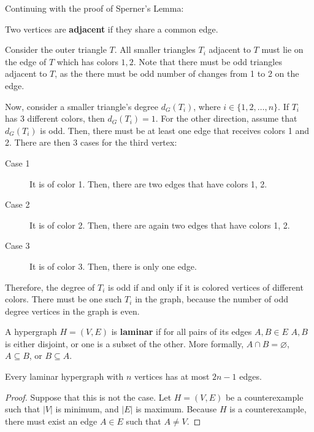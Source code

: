 
Continuing with the proof of Sperner's Lemma:

\begin{definition}
	Two vertices are \textbf{adjacent} if they share a common edge.
\end{definition}

\begin{replacementproof}
	Consider the outer triangle \( T \). All smaller triangles \( T_i \) adjacent to \( T \) must lie on the edge of \( T \) which has colors \( 1,2 \). Note that there must be odd triangles adjacent to \( T \), as the there must be odd number of changes from 1 to 2 on the edge.

	Now, consider a smaller triangle's degree \( d_G(T_i) \), where \( i \in \{1, 2, \ldots , n\}   \). If \( T_i \) has 3 different colors, then \( d_G(T_i) =1\). For the other direction, assume that \( d_G(T_i) \) is odd. Then, there must be at least one edge that receives colors 1 and 2. There are then 3 cases for the third vertex:
	\begin{description}
		\item[Case 1] It is of color 1. Then, there are two edges that have colors 1, 2.
		\item[Case 2] It is of color 2. Then, there are again two edges that have colors 1, 2.
		\item[Case 3] It is of color 3. Then, there is only one edge.
	\end{description}
	Therefore, the degree of \( T_i \) is odd if and only if it is colored vertices of different colors. There must be one such \( T_i \) in the graph, because the number of odd degree vertices in the graph is even.
\end{replacementproof}

\begin{definition}
	A hypergraph \( H=(V, E) \) is \textbf{laminar} if for all pairs of its edges \( A, B \in E \) \( A,B \) is either disjoint, or one is a subset of the other. More formally, \( A \cap B = \varnothing \), \( A \subseteq B \), or \( B \subseteq A \).
\end{definition}

\begin{lemma}
	Every laminar hypergraph with \( n \) vertices has at most \( 2n-1 \) edges.
\end{lemma}
\begin{proof}
	Suppose that this is not the case. Let \( H=(V,E) \) be a counterexample such that \( |V| \) is minimum, and \( |E| \) is maximum. Because \( H \) is a counterexample, there must exist an edge \( A \in E \) such that \( A \neq V \).
\end{proof}
